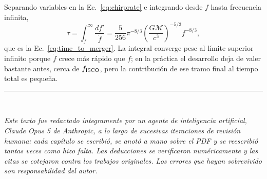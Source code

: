\documentclass[11pt,a4paper,openany]{book}
\begin{document}
Separando variables en la Ec.~\eqref{eq:chirprate} e integrando desde $f$ hasta
frecuencia infinita,
\begin{equation}
  \tau=\int_f^{\infty}\frac{df'}{\dot f}
  =\frac{5}{256}\pi^{-8/3}
  \left(\frac{G\mathcal{M}}{c^{3}}\right)^{-5/3}f^{-8/3} ,
  \label{eq:tau_integral}
\end{equation}
que es la Ec.~\eqref{eq:time_to_merger}. La integral converge pese al
l\'imite superior infinito porque $\dot f$ crece m\'as r\'apido que $f$; en la
pr\'actica el desarrollo deja de valer bastante antes, cerca de
$f_{\rm ISCO}$, pero la contribuci\'on de ese tramo final al tiempo total es
peque\~na.

\renewcommand{\bibname}{Referencias}



\vfill
\noindent\textcolor{black!35}{\rule{\textwidth}{0.4pt}}\\[0.8em]
{\footnotesize\itshape\color{black!55}\noindent
Este texto fue redactado \'integramente por un agente de inteligencia
artificial, Claude Opus 5 de Anthropic, a lo largo de sucesivas iteraciones de
revisi\'on humana: cada cap\'itulo se escribi\'o, se anot\'o a mano sobre el
PDF y se reescribi\'o tantas veces como hizo falta. Las deducciones se
verificaron num\'ericamente y las citas se cotejaron contra los trabajos
originales. Los errores que hayan sobrevivido son responsabilidad del
autor.\par}
\end{document}
